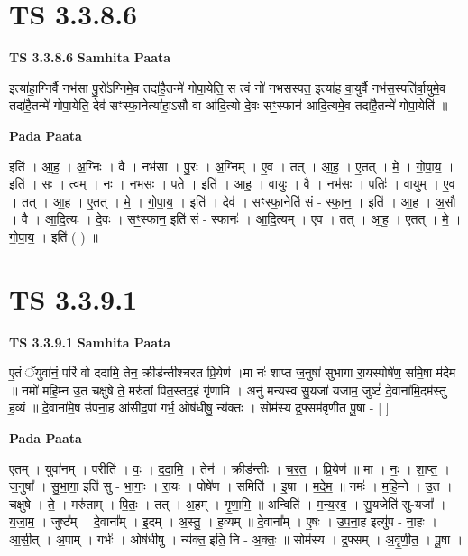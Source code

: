 \documentclass[17pt]{extarticle}
\begin{document}
\section*{ TS 3.3.8.6 }

\textbf{TS 3.3.8.6 } \newline
\textbf{Samhita Paata} \newline

इत्या॑हा॒ग्निर्वै नभ॑सा पु॒रो᳚ऽग्निमे॒व तदा॑है॒तन्मे॑ गोपा॒येति॒ स त्वं नो॑ नभसस्पत॒ इत्या॑ह वा॒युर्वै नभ॑स॒स्पति॑र्वा॒युमे॒व तदा॑है॒तन्मे॑ गोपा॒येति॒ देव॑ सꣳस्फा॒नेत्या॑हा॒ऽसौ वा आ॑दि॒त्यो दे॒वः सꣳ॒॒स्फान॑ आदि॒त्यमे॒व तदा॑है॒तन्मे॑ गोपा॒येति॑ ॥ \newline

\textbf{Pada Paata} \newline

इति॑ । आ॒ह॒ । अ॒ग्निः । वै । नभ॑सा । पु॒रः । अ॒ग्निम् । ए॒व । तत् । आ॒ह॒ । ए॒तत् । मे॒ । गो॒पा॒य॒ । इति॑ । सः । त्वम् । नः॒ । न॒भ॒सः॒ । प॒ते॒ । इति॑ । आ॒ह॒ । वा॒युः । वै । नभ॑सः । पतिः॑ । वा॒युम् । ए॒व । तत् । आ॒ह॒ । ए॒तत् । मे॒ । गो॒पा॒य॒ । इति॑ । देव॑ । सꣳ॒॒स्फा॒नेति॑ सं - स्फा॒न॒ । इति॑ । आ॒ह॒ । अ॒सौ । वै । आ॒दि॒त्यः । दे॒वः । सꣳ॒॒स्फान॒ इति॑ सं - स्फानः॑ । आ॒दि॒त्यम् । ए॒व । तत् । आ॒ह॒ । ए॒तत् । मे॒ । गो॒पा॒य॒ । इति॑ ( ) ॥  \newline




\section*{ TS 3.3.9.1 }

\textbf{TS 3.3.9.1 } \newline
\textbf{Samhita Paata} \newline

ए॒तं ॅयुवा॑नं॒ परि॑ वो ददामि॒ तेन॒ क्रीड॑न्तीश्चरत प्रि॒येण॑ ।मा नः॑ शाप्त ज॒नुषा॑ सुभागा रा॒यस्पोषे॑ण॒ समि॒षा म॑देम ॥ नमो॑ महि॒म्न उ॒त चक्षु॑षे ते॒ मरु॑तां पित॒स्तद॒हं गृ॑णामि । अनु॑ मन्यस्व सु॒यजा॑ यजाम॒ जुष्टं॑ दे॒वाना॑मि॒दम॑स्तु ह॒व्यं ॥ दे॒वाना॑मे॒ष उ॑पना॒ह आ॑सीद॒पां गर्भ॒ ओष॑धीषु॒ न्य॑क्तः । सोम॑स्य द्र॒फ्सम॑वृणीत पू॒षा - [  ] \newline

\textbf{Pada Paata} \newline

ए॒तम् । युवा॑नम् । परीति॑ । वः॒ । द॒दा॒मि॒ । तेन॑ । क्रीड॑न्तीः । च॒र॒त॒ । प्रि॒येण॑ ॥ मा । नः॒ । शा॒प्त॒ । ज॒नुषा᳚ । सु॒भा॒गा॒ इति॑ सु - भा॒गाः॒ । रा॒यः । पोषे॑ण । समिति॑ । इ॒षा । म॒दे॒म॒ ॥ नमः॑ । म॒हि॒म्ने । उ॒त । चक्षु॑षे । ते॒ । मरु॑ताम् । पि॒तः॒ । तत् । अ॒हम् । गृ॒णा॒मि॒ ॥ अन्विति॑ । म॒न्य॒स्व॒ । सु॒यजेति॑ सु-यजा᳚ । य॒जा॒म॒ । जुष्ट᳚म् । दे॒वाना᳚म् । इ॒दम् । अ॒स्तु॒ । ह॒व्यम् ॥ दे॒वाना᳚म् । ए॒षः । उ॒प॒ना॒ह इत्यु॑प - ना॒हः । आ॒सी॒त् । अ॒पाम् । गर्भः॑ । ओष॑धीषु । न्य॑क्त॒ इति॒ नि - अ॒क्तः॒ ॥ सोम॑स्य । द्र॒फ्सम् । अ॒वृ॒णी॒त॒ । पू॒षा ।  \newline
\end{document}
